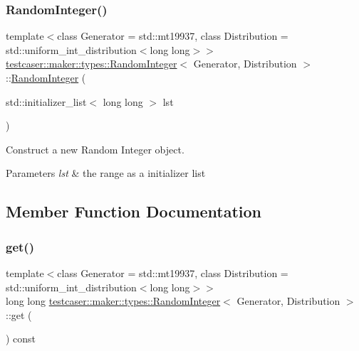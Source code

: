 \subsubsection{\texorpdfstring{RandomInteger()}{RandomInteger()}\hspace{0.1cm}{\footnotesize\ttfamily [3/3]}}
{\footnotesize\ttfamily template$<$class Generator = std\+::mt19937, class Distribution = std\+::uniform\+\_\+int\+\_\+distribution$<$long long$>$$>$ \\
\mbox{\hyperlink{classtestcaser_1_1maker_1_1types_1_1RandomInteger}{testcaser\+::maker\+::types\+::\+Random\+Integer}}$<$ Generator, Distribution $>$\+::\mbox{\hyperlink{classtestcaser_1_1maker_1_1types_1_1RandomInteger}{Random\+Integer}} (\begin{DoxyParamCaption}\item[{std\+::initializer\+\_\+list$<$ long long $>$}]{lst }\end{DoxyParamCaption})\hspace{0.3cm}{\ttfamily [inline]}}



Construct a new Random Integer object. 


\begin{DoxyParams}{Parameters}
{\em lst} & the range as a initializer list \\
\hline
\end{DoxyParams}


\subsection{Member Function Documentation}
\mbox{\label{classtestcaser_1_1maker_1_1types_1_1RandomInteger_a3b7754ca1c579f58b959ca6adb483a51}} 
\subsubsection{\texorpdfstring{get()}{get()}}
{\footnotesize\ttfamily template$<$class Generator = std\+::mt19937, class Distribution = std\+::uniform\+\_\+int\+\_\+distribution$<$long long$>$$>$ \\
long long \mbox{\hyperlink{classtestcaser_1_1maker_1_1types_1_1RandomInteger}{testcaser\+::maker\+::types\+::\+Random\+Integer}}$<$ Generator, Distribution $>$\+::get (\begin{DoxyParamCaption}{ }\end{DoxyParamCaption}) const\hspace{0.3cm}{\ttfamily [inline]}}



